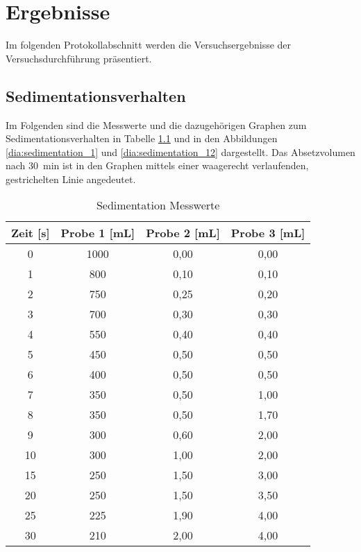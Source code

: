 \chapter{Ergebnisse}
\label{sec:ergebnisse}

Im folgenden Protokollabschnitt werden die Versuchsergebnisse der Versuchsdurchführung präsentiert.




\vspace*{-3.5mm}

\section{Sedimentationsverhalten}
Im Folgenden sind die Messwerte und die dazugehörigen Graphen zum Sedimentationsverhalten in Tabelle \ref{tab:sed.data} und in den Abbildungen \ref{dia:sedimentation_1} und \ref{dia:sedimentation_12} dargestellt. Das Absetzvolumen nach \SI{30}{\minute} ist in den Graphen mittels einer waagerecht verlaufenden, gestrichelten Linie angedeutet.

\vspace*{-2.5mm}
\renewcommand{\arraystretch}{1.2}
\begin{table}[h!]
	\centering
	\caption{Sedimentation Messwerte}
	\begin{tabular}{c|ccc}
		\toprule
		\textbf{Zeit [\si{\second}]} & \multicolumn{1}{l}{\textbf{Probe 1 [\si{\milli\liter}]}} & \multicolumn{1}{l}{\textbf{Probe 2 [\si{\milli\liter}]}} & \multicolumn{1}{l}{\textbf{Probe 3 [\si{\milli\liter}]}} \\
		\midrule
		\rowcolor[rgb]{ .851,  .851,  .851} 0     & 1000  & 0,00  & 0,00 \\
		1     & 800   & 0,10  & 0,10 \\
		\rowcolor[rgb]{ .851,  .851,  .851} 2     & 750   & 0,25  & 0,20 \\
		3     & 700   & 0,30  & 0,30 \\
		\rowcolor[rgb]{ .851,  .851,  .851} 4     & 550   & 0,40  & 0,40 \\
		5     & 450   & 0,50  & 0,50 \\
		\rowcolor[rgb]{ .851,  .851,  .851} 6     & 400   & 0,50  & 0,50 \\
		7     & 350   & 0,50  & 1,00 \\
		\rowcolor[rgb]{ .851,  .851,  .851} 8     & 350   & 0,50  & 1,70 \\
		9     & 300   & 0,60  & 2,00 \\
		\rowcolor[rgb]{ .851,  .851,  .851} 10    & 300   & 1,00  & 2,00 \\
		15    & 250   & 1,50  & 3,00 \\
		\rowcolor[rgb]{ .851,  .851,  .851} 20    & 250   & 1,50  & 3,50 \\
		25    & 225   & 1,90  & 4,00 \\
		\rowcolor[rgb]{ .851,  .851,  .851} 30    & 210   & 2,00  & 4,00 \\
		\bottomrule
	\end{tabular}%
	\label{tab:sed.data}%
\end{table}%
\FloatBarrier


